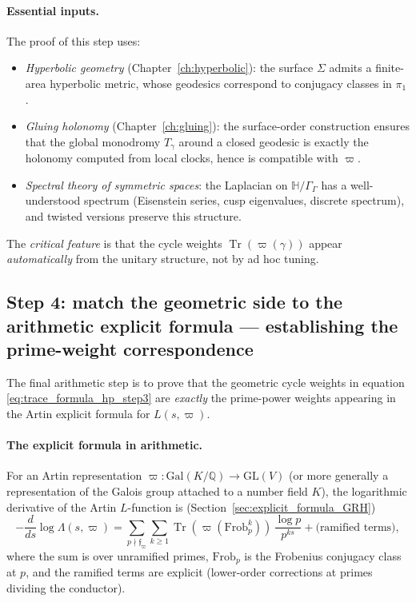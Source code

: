\documentclass[11pt,oneside]{amsbook}
\numberwithin{equation}{section}
\theoremstyle{plain}
\theoremstyle{definition}
\theoremstyle{remark}
\newcommand{\HH}{\mathbb{H}}
\DeclareMathOperator{\Tr}{\mathrm{Tr}}
\begin{document}
\paragraph{Essential inputs.}
The proof of this step uses:
\begin{itemize}
\item \emph{Hyperbolic geometry} (Chapter~\ref{ch:hyperbolic}): the surface $\Sigma$ admits a finite-area hyperbolic metric, whose geodesics correspond to conjugacy classes in $\pi_1$.
\item \emph{Gluing holonomy} (Chapter~\ref{ch:gluing}): the surface-order construction ensures that the global monodromy $T_\gamma$ around a closed geodesic is exactly the holonomy computed from local clocks, hence is compatible with $\varpi$.
\item \emph{Spectral theory of symmetric spaces}: the Laplacian on $\HH/\Gamma_\Gamma$ has a well-understood spectrum (Eisenstein series, cusp eigenvalues, discrete spectrum), and twisted versions preserve this structure.
\end{itemize}

The \emph{critical feature} is that the cycle weights $\Tr(\varpi(\gamma))$ appear \emph{automatically} from the unitary structure, not by ad hoc tuning.

\subsection{Step 4: match the geometric side to the arithmetic explicit formula --- establishing the prime-weight correspondence}

The final arithmetic step is to prove that the geometric cycle weights in equation \eqref{eq:trace_formula_hp_step3} are \emph{exactly} the prime-power weights appearing in the Artin explicit formula for $L(s,\varpi)$.

\paragraph{The explicit formula in arithmetic.}
For an Artin representation $\varpi:\mathrm{Gal}(K/\mathbb{Q}) \to \mathrm{GL}(V)$ (or more generally a representation of the Galois group attached to a number field $K$), the logarithmic derivative of the Artin $L$-function is (Section~\ref{sec:explicit_formula_GRH})
\begin{equation}
\label{eq:artin_logderiv_step4}
-\frac{d}{ds}\log\Lambda(s,\varpi) = \sum_{p\nmid\mathfrak{f}_\varpi}\sum_{k\ge 1}\Tr(\varpi(\mathrm{Frob}_p^k))\,\frac{\log p}{p^{ks}}+\text{(ramified terms)},
\end{equation}
where the sum is over unramified primes, $\mathrm{Frob}_p$ is the Frobenius conjugacy class at $p$, and the ramified terms are explicit (lower-order corrections at primes dividing the conductor).
\end{document}
